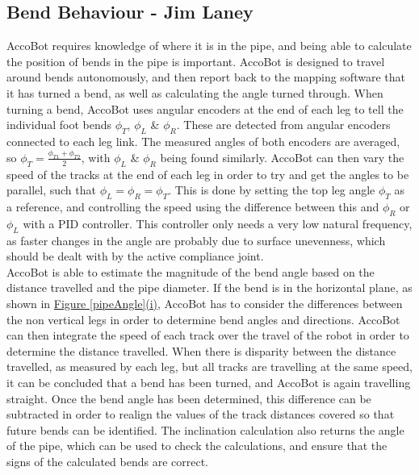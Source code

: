 \documentclass[11pt]{article}		%
\begin{document}
		\subsection[Bend Behaviour]{Bend Behaviour - Jim Laney}
		
			AccoBot requires knowledge of where it is in the pipe, and being able to calculate the position of bends in the pipe is important.
			AccoBot is designed to travel around bends autonomously, and then report back to the mapping software that it has turned a bend, as well as calculating the angle turned through.
			When turning a bend, AccoBot uses angular encoders at the end of each leg to tell the individual foot bends $\phi_T$, $\phi_L$ \& $\phi_R$.
			These are detected from angular encoders connected to each leg link.
			The measured angles of both encoders are averaged, so $\phi_T = \frac{\phi_{T1} + \phi_{T2}}{2}$, with $\phi_L$ \& $\phi_R$ being found similarly.
			AccoBot can then vary the speed of the tracks at the end of each leg in order to try and get the angles to be parallel, such that $\phi_L = \phi_R = \phi_T$.
			This is done by setting the top leg angle $\phi_T$ as a reference, and controlling the speed using the difference between this and $\phi_R$ or $\phi_L$ with a PID controller.
			This controller only needs a very low natural frequency, as faster changes in the angle are probably due to surface unevenness, which should be dealt with by the active compliance joint.
			\\
			AccoBot is able to estimate the magnitude of the bend angle based on the distance travelled and the pipe diameter.
			If the bend is in the horizontal plane, as shown in \hyperref[pipeAngle]{Figure \ref*{pipeAngle}(i)}, AccoBot has to consider the differences between the non vertical legs in order to determine bend angles and directions.
			AccoBot can then integrate the speed of each track over the travel of the robot in order to determine the distance travelled.
			When there is disparity between the distance travelled, as measured by each leg, but all tracks are travelling at the same speed, it can be concluded that a bend has been turned, and AccoBot is again travelling straight.
			Once the bend angle has been determined, this difference can be subtracted in order to realign the values of the track distances covered so that future bends can be identified.
			The inclination calculation also returns the angle of the pipe, which can be used to check the calculations, and ensure that the signs of the calculated bends are correct.
			\\
\end{document}
